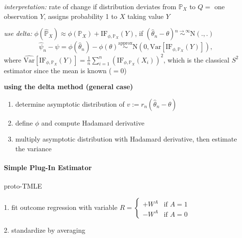 \documentclass[8pt,twoside]{extarticle}
\begin{document}
\begin{multicols}{2}
 \textit{interpretation:} rate of change if distribution deviates from $\mathbb{P}_X$ to $Q=$  one observation $Y$, assigns probability 1 to $X$ taking  value $Y$ 

 \textit{use delta:} $\phi(\hat{\mathbb{P}}_X) \approx \phi(\mathbb{P}_X) + \mathrm{IF}_{\phi, \mathbb{P}_X}(Y)$, if $(\hat{\theta}_n - \theta) \overset{n\to\infty}{\sim} \mathrm{N}(.,.)$
$$\hat{\psi}_n - \psi = \phi(\hat{\theta}_n)-\phi(\theta) \overset{\text{approx}}{\sim} \mathrm{N}\left(0, \mathrm{Var}[\mathrm{IF}_{\phi, \mathbb{P}_X}(Y)]\right),$$
where
$\widehat{\mathrm{Var}}[\mathrm{IF}_{\phi, \mathbb{P}_X}(Y)] = \frac{1}{n}\sum_{i=1}^n \left(\mathrm{IF}_{\phi, \mathbb{P}_X}(X_i)\right)^2$, which is the classical $S^2$ estimator since the mean is known ($=0$)

 \textbf{using the delta method (general case)}
\begin{enumerate}[leftmargin=*, itemsep=0em, topsep=0pt, partopsep=0pt,parsep=0pt]
\item determine asymptotic distribution of $v:=r_n(\hat{\theta}_n -\theta)$
\item define $\phi$ and compute Hadamard derivative
\item multiply asymptotic distribution with Hadamard derivative, then estimate the variance
\end{enumerate}


\paragraph{Simple Plug-In Estimator} proto-TMLE   \vspace{-0.3em}

1. fit outcome regression with variable $R = \begin{cases} +W^A & \text{if } A{=}1 \\ -W^A & \text{if } A{=}0 \end{cases}$ \vspace{-0.9em}

2. standardize by averaging


\vspace{0.2em}
 \colorbox{lightgray!20!white}{\begin{minipage}{28em}


\end{minipage}}
\end{multicols}
\end{document}

